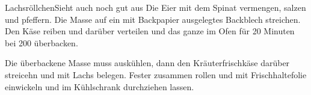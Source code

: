 \begin{recipe}{Lachsröllchen}{Sieht auch noch gut aus}
  \label{Lachsrolle}
  \inglist
  \steps
  Die Eier mit dem Spinat vermengen, salzen und pfeffern. Die Masse auf ein mit
  Backpapier ausgelegtes Backblech streichen. Den Käse reiben und darüber
  verteilen und das ganze im Ofen für 20 Minuten bei 200 \celsius überbacken.

  Die überbackene Masse muss auskühlen, dann den Kräuterfrischkäse darüber
  streicehn und mit Lachs belegen. Fester zusammen rollen und mit
  Frischhaltefolie einwickeln und im Kühlschrank durchziehen lassen.
\end{recipe}
